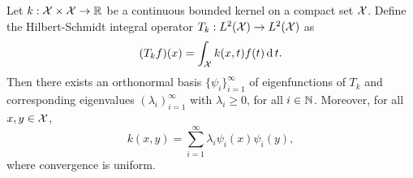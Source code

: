 Let \(k : \mathcal{X} \times \mathcal{X} \to \mathbb{R}\) be a continuous bounded kernel on a compact set \(\mathcal{X}\).
Define the Hilbert-Schmidt integral operator \(T_k : L^2(\mathcal{X}) \to L^2(\mathcal{X})\) as
\begin{equation}
    (T_k f)(x) = \int_{\mathcal{X}} k(x, t) f(t) \operatorname{d} t.
\end{equation}
Then there exists an orthonormal basis \(\{\psi_{i}\}_{i=1}^\infty\) of eigenfunctions of \(T_k\) and corresponding eigenvalues \((\lambda_i)_{i=1}^\infty\) with \(\lambda_i \geq 0\), for all \(i \in \mathbb{N}\).
Moreover, for all \(x,y \in \mathcal{X}\),
\begin{equation}
    k(x,y) = \sum_{i=1}^{\infty} \lambda_i \psi_i(x) \psi_i(y),
\end{equation}
where convergence is uniform.